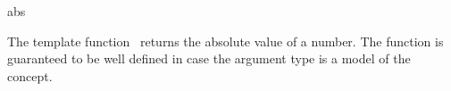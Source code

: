 \begin{ccRefFunction}{abs}

\ccDefinition

The template function \ccRefName\ returns the absolute value of a number.
The function is guaranteed to be well defined in case the argument type 
is a model of the  concept. 



\ccSeeAlso
{} \\
\\
 
\end{ccRefFunction}
